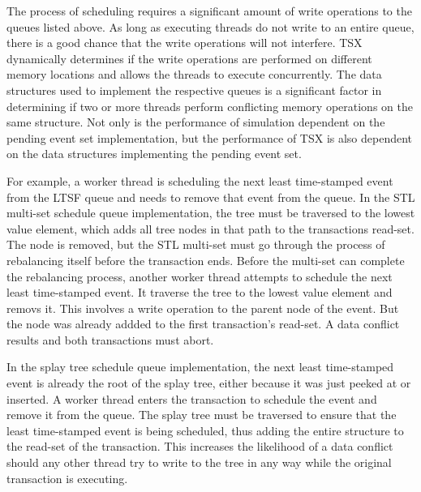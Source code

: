 \documentclass[11pt]{book}
\begin{document}
The process of scheduling requires a significant amount of write operations to
the queues listed above.  As long as executing threads do not write to an entire
queue, there is a good chance that the write operations will not interfere.  TSX
dynamically determines if the write operations are performed on different memory
locations and allows the threads to execute concurrently.  The data structures
used to implement the respective queues is a significant factor in determining
if two or more threads perform conflicting memory operations on the same
structure.  Not only is the performance of simulation dependent on the pending
event set implementation, but the performance of TSX is also dependent on the
data structures implementing the pending event set.

For example, a worker thread is scheduling the next least time-stamped event
from the LTSF queue and needs to remove that event from the queue.  In the STL
multi-set schedule queue implementation, the tree must be traversed to the
lowest value element, which adds all tree nodes in that path to the transactions
read-set.  The node is removed, but the STL multi-set must go through the
process of rebalancing itself before the transaction ends.  Before the multi-set
can complete the rebalancing process, another worker thread attempts to schedule
the next least time-stamped event. It traverse the tree to the lowest value
element and removs it.  This involves a write operation to the parent node of
the event.  But the node was already addded to the first transaction's read-set.
A data conflict results and both transactions must abort.

In the splay tree schedule queue implementation, the next least time-stamped event
is already the root of the splay tree, either because it was just peeked at or
inserted.  A worker thread enters the transaction to schedule the event and
remove it from the queue.  The splay tree must be traversed to ensure that the
least time-stamped event is being scheduled, thus adding the entire structure to
the read-set of the transaction.  This increases the likelihood of a data
conflict should any other thread try to write to the tree in any way while the
original transaction is executing.
\end{document}
